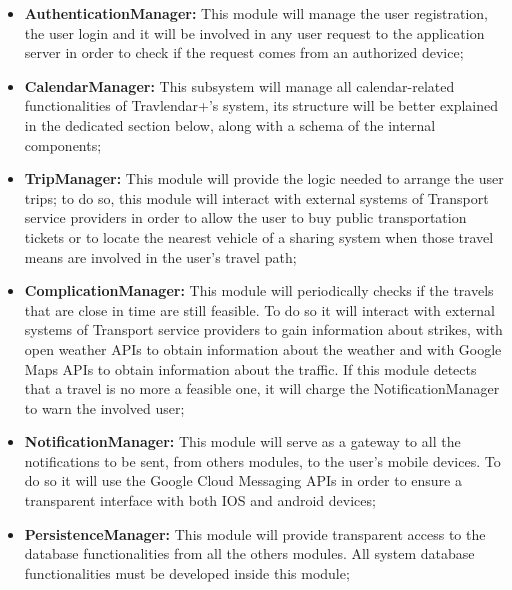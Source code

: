 \begin{itemize}
	\item \textbf{AuthenticationManager:} This module will manage the user registration, the user login and it will be involved in any user request to the application server in order to check if the request comes from an authorized device;
	\item \textbf{CalendarManager:} This subsystem will manage all calendar-related functionalities of Travlendar+'s system, its structure will be better explained in the dedicated section below, along with a schema of the internal components;
	\item \textbf{TripManager:} This module will provide the logic needed to arrange the user trips; to do so, this module will interact with external systems of Transport service providers in order to allow the user to buy public transportation tickets or to locate the nearest vehicle of a sharing system when those travel means are involved in the user's travel path;
	\item \textbf{ComplicationManager:} This module will periodically checks if the travels that are close in time are still feasible. To do so it will interact with external systems of Transport service providers to gain information about strikes, with open weather APIs to obtain information about the weather and with Google Maps APIs to obtain information about the traffic. If this module detects that a travel is no more a feasible one, it will charge the NotificationManager to warn the involved user;
	\item \textbf{NotificationManager:} This module will serve as a gateway to all the notifications to be sent, from others modules, to the user's mobile devices. To do so it will use the Google Cloud Messaging APIs in order to ensure a transparent interface with both IOS and android devices;
	\item \textbf{PersistenceManager:} This module will provide transparent access to the database functionalities from all the others modules. All system database functionalities must be developed inside this module;
\end{itemize}

